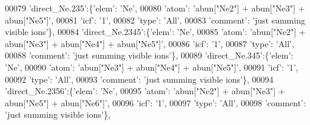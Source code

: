 \begin{DoxyCode}
00079                          \textcolor{stringliteral}{'direct\_Ne.235'}:\{\textcolor{stringliteral}{'elem'}: \textcolor{stringliteral}{'Ne'},
00080                                        \textcolor{stringliteral}{'atom'}: \textcolor{stringliteral}{'abun["Ne2"] + abun["Ne3"] + abun["Ne5"]'},
00081                                        \textcolor{stringliteral}{'icf'}: \textcolor{stringliteral}{'1'},
00082                                        \textcolor{stringliteral}{'type'}: \textcolor{stringliteral}{'All'},
00083                                        \textcolor{stringliteral}{'comment'}: \textcolor{stringliteral}{'just summing visible ions'}\},
00084                          \textcolor{stringliteral}{'direct\_Ne.2345'}:\{\textcolor{stringliteral}{'elem'}: \textcolor{stringliteral}{'Ne'},
00085                                        \textcolor{stringliteral}{'atom'}: \textcolor{stringliteral}{'abun["Ne2"] + abun["Ne3"] + abun["Ne4"] + abun["Ne5"]'},
00086                                        \textcolor{stringliteral}{'icf'}: \textcolor{stringliteral}{'1'},
00087                                        \textcolor{stringliteral}{'type'}: \textcolor{stringliteral}{'All'},
00088                                        \textcolor{stringliteral}{'comment'}: \textcolor{stringliteral}{'just summing visible ions'}\},
00089                          \textcolor{stringliteral}{'direct\_Ne.345'}:\{\textcolor{stringliteral}{'elem'}: \textcolor{stringliteral}{'Ne'},
00090                                        \textcolor{stringliteral}{'atom'}: \textcolor{stringliteral}{'abun["Ne3"] + abun["Ne4"] + abun["Ne5"]'},
00091                                        \textcolor{stringliteral}{'icf'}: \textcolor{stringliteral}{'1'},
00092                                        \textcolor{stringliteral}{'type'}: \textcolor{stringliteral}{'All'},
00093                                        \textcolor{stringliteral}{'comment'}: \textcolor{stringliteral}{'just summing visible ions'}\},
00094                          \textcolor{stringliteral}{'direct\_Ne.2356'}:\{\textcolor{stringliteral}{'elem'}: \textcolor{stringliteral}{'Ne'},
00095                                        \textcolor{stringliteral}{'atom'}: \textcolor{stringliteral}{'abun["Ne2"] + abun["Ne3"] + abun["Ne5"] + abun["Ne6"]'},
00096                                        \textcolor{stringliteral}{'icf'}: \textcolor{stringliteral}{'1'},
00097                                        \textcolor{stringliteral}{'type'}: \textcolor{stringliteral}{'All'},
00098                                        \textcolor{stringliteral}{'comment'}: \textcolor{stringliteral}{'just summing visible ions'}\},

\end{DoxyCode}
